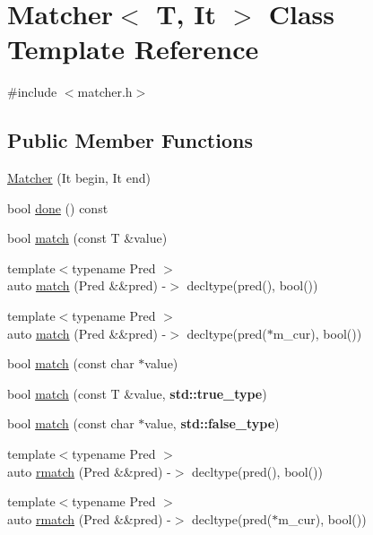 \hypertarget{class_matcher}{}\section{Matcher$<$ T, It $>$ Class Template Reference}
\label{class_matcher}


{\ttfamily \#include $<$matcher.\+h$>$}

\subsection*{Public Member Functions}
\begin{DoxyCompactItemize}
\item 
\hyperlink{class_matcher_a6a90be25ea49908ed9d6c23f8bb9c47f}{Matcher} (It begin, It end)
\item 
bool \hyperlink{class_matcher_afb8b791024067df37631ce67dcd4c656}{done} () const
\item 
bool \hyperlink{class_matcher_ad10d558fa9248baf4490d50ad395a55e}{match} (const T \&value)
\item 
{\footnotesize template$<$typename Pred $>$ }\\auto \hyperlink{class_matcher_a1f088e17e646f4e53a9d0297b4bd4d8b}{match} (Pred \&\&pred) -\/$>$ decltype(pred(), bool())
\item 
{\footnotesize template$<$typename Pred $>$ }\\auto \hyperlink{class_matcher_aae9b912f87795d05054746619e237b2d}{match} (Pred \&\&pred) -\/$>$ decltype(pred($\ast$m\+\_\+cur), bool())
\item 
bool \hyperlink{class_matcher_adeb27a509701a96d922d98ade0080bcd}{match} (const char $\ast$value)
\item 
bool \hyperlink{class_matcher_acf713afbc98dd0b324ed04f52ccad568}{match} (const T \&value, \textbf{ std\+::true\+\_\+type})
\item 
bool \hyperlink{class_matcher_a0abb0a8d3e921a4fe96fdd8646e7afd7}{match} (const char $\ast$value, \textbf{ std\+::false\+\_\+type})
\item 
{\footnotesize template$<$typename Pred $>$ }\\auto \hyperlink{class_matcher_a016cf13b6cf1119494a9723fb9419fd4}{rmatch} (Pred \&\&pred) -\/$>$ decltype(pred(), bool())
\item 
{\footnotesize template$<$typename Pred $>$ }\\auto \hyperlink{class_matcher_ad0b897b87cede7752c385e7d55bcaff4}{rmatch} (Pred \&\&pred) -\/$>$ decltype(pred($\ast$m\+\_\+cur), bool())

\end{DoxyCompactItemize}
